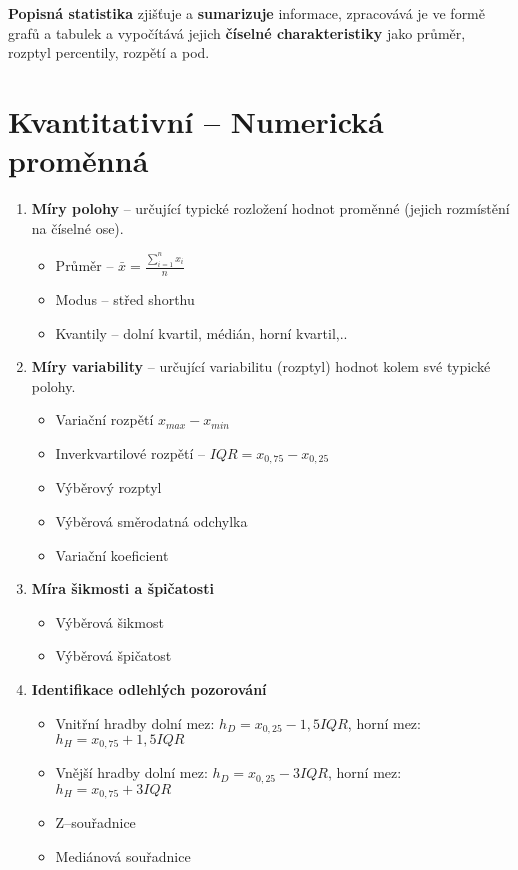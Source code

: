 \textbf{Popisná statistika} zjišťuje a \textbf{sumarizuje} informace, zpracovává je ve formě grafů a tabulek a vypočítává jejich \textbf{číselné charakteristiky} jako průměr, rozptyl percentily, rozpětí a pod.

\section{Kvantitativní -- Numerická proměnná}
\begin{enumerate}
    \item \textbf{Míry polohy} --  určující typické rozložení hodnot proměnné (jejich rozmístění na číselné ose).

          \begin{itemize}
              \item Průměr -- $\bar{x} = \frac{\sum\limits_{i=1}^n x_i}{n}$
              \item Modus -- střed shorthu
              \item Kvantily -- dolní kvartil, médián, horní kvartil,..
          \end{itemize}
    \item \textbf{Míry variability} -- určující variabilitu (rozptyl) hodnot kolem své typické polohy.
          \begin{itemize}
              \item Variační rozpětí $x_{max} - x_{min}$
              \item Inverkvartilové rozpětí -- $IQR = x_{0,75} - x_{0,25}$
              \item Výběrový rozptyl
              \item Výběrová směrodatná odchylka
              \item Variační koeficient
          \end{itemize}
    \item \textbf{Míra šikmosti a špičatosti}
          \begin{itemize}
              \item Výběrová šikmost
              \item Výběrová špičatost
          \end{itemize}
    \item \textbf{Identifikace odlehlých pozorování}
          \begin{itemize}
              \item Vnitřní hradby dolní mez: $h_D = x_{0,25} - 1,5IQR$, horní mez: $h_H = x_{0,75} + 1,5IQR$
              \item Vnější hradby dolní mez: $h_D = x_{0,25} - 3IQR$, horní mez: $h_H = x_{0,75} + 3IQR$
              \item Z--souřadnice
              \item Mediánová souřadnice
          \end{itemize}
\end{enumerate}

